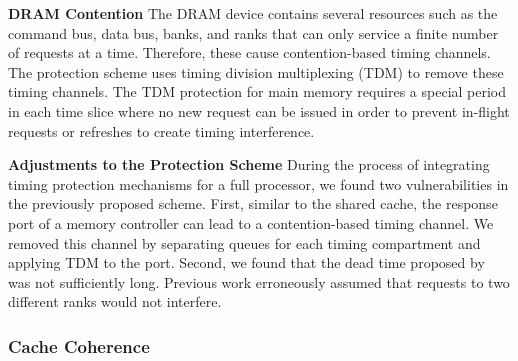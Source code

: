 \textbf{DRAM Contention}
The DRAM device contains several resources such as the command bus, data
bus, banks, and ranks that can only service a finite number of requests at a 
time. Therefore, these cause contention-based timing channels.
The protection scheme uses timing division multiplexing (TDM) to remove these
timing channels. The TDM protection for main memory requires a special period 
in each time slice where no new request can be issued in order to prevent
in-flight requests or refreshes to create timing interference.


\textbf{Adjustments to the Protection Scheme}
During the process of integrating timing protection mechanisms for a full
processor, we found two vulnerabilities in the previously proposed scheme.
First, similar to the shared cache, the response port of a memory controller
can lead to a contention-based timing channel. We removed this channel by
separating queues for each timing compartment and applying TDM to the port.
Second, we found that the dead time proposed by ~\cite{ushpca14} was not 
sufficiently long. Previous work erroneously assumed that requests to two
different ranks would not interfere.

\subsubsection{Cache Coherence}

